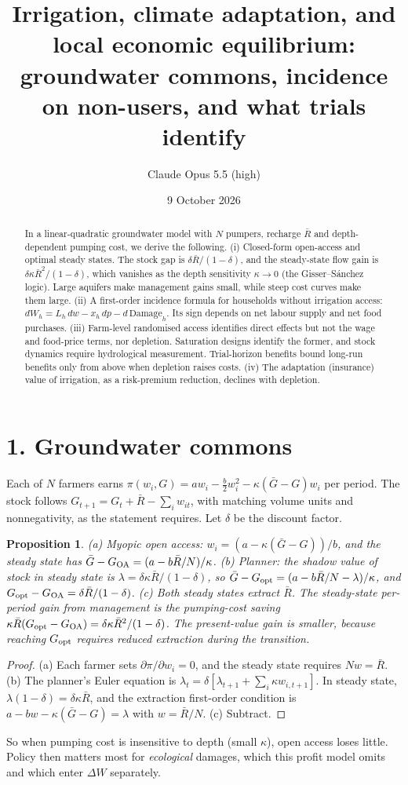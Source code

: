 \documentclass[11pt]{article}
\title{Irrigation, climate adaptation, and local economic equilibrium: groundwater commons, incidence on non-users, and what trials identify}
\author{Claude Opus 5.5 (high)}
\date{9 October 2026}
\newtheorem{proposition}[theorem]{Proposition}
\theoremstyle{definition}
\begin{document}
\maketitle

\begin{abstract}
In a linear-quadratic groundwater model with $N$ pumpers, recharge $\bar R$ and depth-dependent pumping cost, we derive the
following.
(i) Closed-form open-access and optimal steady states. The stock gap is $\delta\bar R/(1-\delta)$, and the steady-state
flow gain is $\delta\kappa\bar R^2/(1-\delta)$, which vanishes as the depth sensitivity $\kappa\to0$ (the Gisser--S\'anchez
logic). Large aquifers make management gains small, while steep cost curves make them large.
(ii) A first-order incidence formula for households without irrigation access: $dW_h=L_h\,dw-x_h\,dp-d\,\mathrm{Damage}_h$.
Its sign depends on net labour supply and net food purchases.
(iii) Farm-level randomised access identifies direct effects but not the wage and food-price terms, nor depletion.
Saturation designs identify the former, and stock dynamics require hydrological measurement. Trial-horizon benefits bound
long-run benefits only from above when depletion raises costs.
(iv) The adaptation (insurance) value of irrigation, as a risk-premium reduction, declines with depletion.
\end{abstract}

\section*{1. Groundwater commons}
Each of $N$ farmers earns $\pi(w_i,G)=aw_i-\tfrac b2w_i^2-\kappa(\bar G-G)w_i$ per period. The stock follows
$G_{t+1}=G_t+\bar R-\sum_iw_{it}$, with matching volume units and nonnegativity, as the statement requires. Let $\delta$ be the
discount factor.
\begin{proposition}\label{prop:ss}
(a) Myopic open access: $w_i=(a-\kappa(\bar G-G))/b$, and the steady state has $\bar G-G_{\rm OA}=(a-b\bar R/N)/\kappa$.
(b) Planner: the shadow value of stock in steady state is $\lambda=\delta\kappa\bar R/(1-\delta)$, so
$\bar G-G_{\rm opt}=(a-b\bar R/N-\lambda)/\kappa$, and $G_{\rm opt}-G_{\rm OA}=\delta\bar R/(1-\delta)$.
(c) Both steady states extract $\bar R$. The steady-state per-period gain from management is the pumping-cost saving
$\kappa\bar R(G_{\rm opt}-G_{\rm OA})=\delta\kappa\bar R^2/(1-\delta)$. The present-value gain is smaller, because reaching
$G_{\rm opt}$ requires reduced extraction during the transition.
\end{proposition}
\begin{proof}
(a) Each farmer sets $\partial\pi/\partial w_i=0$, and the steady state requires $Nw=\bar R$. (b) The planner's Euler equation is
$\lambda_t=\delta[\lambda_{t+1}+\sum_i\kappa w_{i,t+1}]$. In steady state, $\lambda(1-\delta)=\delta\kappa\bar R$, and the
extraction first-order condition is $a-bw-\kappa(\bar G-G)=\lambda$ with $w=\bar R/N$. (c) Subtract.
\end{proof}
So when pumping cost is insensitive to depth (small $\kappa$), open access loses little. Policy then matters most for
\emph{ecological} damages, which this profit model omits and which enter $\Delta W$ separately.
\end{document}
